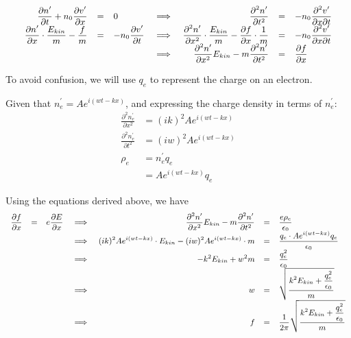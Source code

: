 \documentclass{paper}
\begin{document}
    \[
    \small
    \def\arraystretch{1.5}
    \begin{array}{r c l c r c l}
        \dfrac{\partial n^\prime}{\partial t} + n_0\dfrac{\partial v^\prime}{\partial x} &= &0
        &\implies&\dfrac{\partial^2 n^\prime}{\partial t^2} &=&-n_0\dfrac{\partial^2 v^\prime}{\partial x\partial t} \\ %
        \dfrac{\partial n^\prime}{\partial x}\cdot \dfrac{E_{kin}}{m} - \dfrac{f}{m}  &= &-n_0\dfrac{\partial v^\prime}{\partial t} 
        &\implies& \dfrac{\partial^2 n^\prime}{\partial x^2} \cdot \dfrac{E_{kin}}{m} - \dfrac{\partial f}{\partial x} \cdot \dfrac{1}{m}&= & -n_0\dfrac{\partial^2 v^\prime}{\partial x\partial t}\\
        & & &\implies &\dfrac{\partial^2 n^\prime}{\partial x^2} E_{kin} - m\dfrac{\partial^2 n^\prime}{\partial t^2} &= &\dfrac{\partial f}{\partial x}\\
    \end{array}
    \]
    
    To avoid confusion, we will use $q_e$ to represent the charge on an electron.

    Given that \(n_e^\prime = Ae^{i(w t - k x)}\), and expressing the charge density in terms of $n_e^\prime$:
    \begin{align*}
        \frac{\partial^2 n_e^\prime}{\partial x^2} &= (ik)^2 Ae^{i(w t - k x)}\\
        \frac{\partial^2 n_e^\prime}{\partial t^2} &= (iw)^2 Ae^{i(w t - k x)}\\
        \rho_e &= n_e^\prime q_e\\
        &= Ae^{i(w t - k x)} q_e
    \end{align*}
    
    Using the equations derived above, we have
    \[
    \small
    \def\arraystretch{1.5}
    \begin{array}{r c l c r c l}
        \dfrac{\partial f}{\partial x} &=& e\dfrac{\partial E}{\partial x} &\implies&
        \dfrac{\partial^2 n^\prime}{\partial x^2} E_{kin} - m\dfrac{\partial^2 n^\prime}{\partial t^2} &=& \dfrac{e\rho_e}{\epsilon_0}\\
        & & &\implies& (ik)^2 Ae^{i(w t - k x)} \cdot E_{kin} - (iw)^2 Ae^{i(w t - k x)} \cdot m &=& \dfrac{q_e \cdot Ae^{i(w t - k x)} q_e}{\epsilon_0}\\
        & & &\implies& -k^2 E_{kin} + w^2 m &=& \dfrac{q_e^2}{\epsilon_0}\\
        & & &\implies& w &=& \sqrt{\dfrac{k^2E_{kin} + \dfrac{q_e^2}{\epsilon_0}}{m}}\\
        & & &\implies& f &=& \dfrac{1}{2\pi} \sqrt{\dfrac{k^2E_{kin} + \dfrac{q_e^2}{\epsilon_0}}{m}}
    \end{array}
    \]
    
\end{document}
